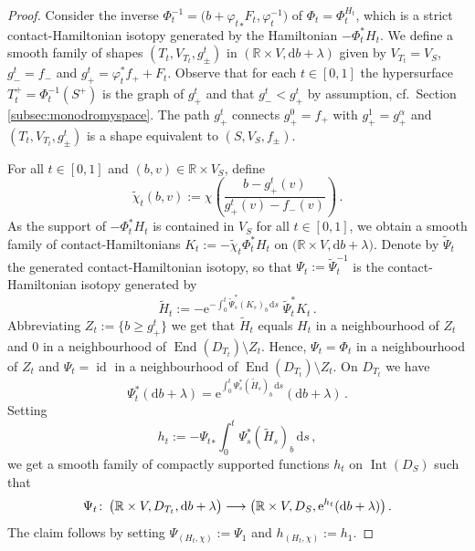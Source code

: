 \documentclass{amsart}
\theoremstyle{definition}
\def\co{\colon\thinspace}
\newcommand{\rmd}{\mathrm d}
\newcommand{\rme}{\mathrm e}
\newcommand{\R}{\mathbb R}
\newcommand{\lra}{\longrightarrow}
\DeclareMathOperator{\End}{\mathrm{End}}
\DeclareMathOperator{\id}{\mathrm{id}}
\DeclareMathOperator{\Int}{\mathrm{Int}}
\begin{document}
\begin{proof}
Consider the inverse
$\Phi_t^{-1}=\big(b+{\varphi_t}_*F_t,\varphi_t^{-1}\big)$
of $\Phi_t=\Phi_t^{H_t}$,
which is a strict contact-Hamiltonian isotopy
generated by the Hamiltonian $-\Phi_t^*H_t$.
We define a smooth family of
shapes $(T_t,V_{T_t},g_{\pm}^t)$
in $(\R\times V,\rmd b+\lambda)$
given by $V_{T_t}=V_S$, $g_-^t=f_-$
and $g_+^t=\varphi_t^*f_++F_t$.
Observe that for each $t\in[0,1]$
the hypersurface
$T^+_t=\Phi_t^{-1}(S^+)$
is the graph of $g_+^t$
and that $g_-^t<g_+^t$ by assumption,
cf.\ Section \ref{subsec:monodromyspace}.
The path $g_+^t$ connects
$g_+^0=f_+$ with $g_+^1=g_+^{\alpha}$
and
$(T_t,V_{T_t},g_{\pm}^t)$ is a shape
equivalent to $(S,V_S,f_{\pm})$.

For all $t\in[0,1]$
and $(b,v)\in\R\times V_S$, define
\[
\tilde{\chi}_t(b,v):=
\chi\left(\frac{b-g_+^t(v)}{g_+^t(v)-f_-(v)}\right)
\,.
\]
As the support of $-\Phi_t^*H_t$
is contained in $V_S$ for all $t\in[0,1]$,
we obtain a smooth family
of contact-Hamiltonians $K_t:=-\tilde{\chi}_t\Phi_t^*H_t$
on $\big(\R\times V,\rmd b+\lambda\big)$.
Denote by $\tilde{\Psi}_t$ the generated
contact-Hamiltonian isotopy,
so that $\Psi_t:=\tilde{\Psi}_t^{-1}$
is the contact-Hamiltonian isotopy generated by
\[
 \tilde{H}_t:=
 -\rme^{-\int_0^t\tilde{\Psi}_s^*(K_s)_b\,\rmd s}\;
 \tilde{\Psi}_t^*K_t
 \,.
\]
Abbreviating $Z_t:=\{b\geq g_+^t\}$
we get that $\tilde{H}_t$ equals $H_t$ in a neighbourhood of $Z_t$
and $0$ in a neighbourhood of $\End(D_{T_t})\setminus Z_t$.
Hence,
$\Psi_t=\Phi_t$ in a neighbourhood of $Z_t$
and $\Psi_t=\id$ in a neighbourhood of $\End(D_{T_t})\setminus Z_t$.
On $D_{T_t}$ we have
\[
\Psi_t^*(\rmd b+\lambda)=
\rme^{\int_0^t\Psi_s^*(\tilde{H}_s)_b\,\rmd s}
(\rmd b+\lambda)
\,.
\]
Setting
\[
 h_t:=
 -{\Psi_t}_*
 \int_0^t\Psi_s^*(\tilde{H}_s)_b\,\rmd s
 \,,
\]
we get a smooth family of compactly supported
functions $h_t$ on $\Int(D_S)$ such that
\[
 \Psi_t\co
 \big(\R\times V,D_{T_t},\rmd b+\lambda\big)
 \lra
 \big(\R\times V,D_S,\rme^{h_t}(\rmd b+\lambda)\big)
 \,.
\]
The claim follows by setting $\Psi_{(H_t,\chi)}:=\Psi_1$ and
$h_{(H_t,\chi)}:=h_1$.
\end{proof}
\end{document}

